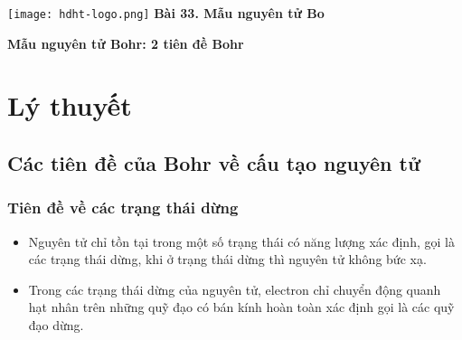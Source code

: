 \newcommand{\chapter}[2][]{
	\newcommand{\chapname}{#2}
	\begin{flushleft}
		\begin{minipage}[t]{\linewidth}
			\texttt{[image: hdht-logo.png]}
			\hspace{0pt}	
			\sffamily\bfseries\large Bài  33. Mẫu nguyên tử Bo
			\begin{flushleft}
				\huge\bfseries #1
			\end{flushleft}
		\end{minipage}
	\end{flushleft}
	\vspace{1cm}
	\normalfont\normalsize
}
\chapter[Mẫu nguyên tử Bohr: 2 tiên đề Bohr]{Mẫu nguyên tử Bohr: 2 tiên đề Bohr}

\section{Lý thuyết}

\subsection{Các tiên đề của Bohr về cấu tạo nguyên tử}
\subsubsection{Tiên đề về các trạng thái dừng}
	\begin{itemize}
		\item Nguyên tử chỉ tồn tại trong một số trạng thái có năng lượng xác định, gọi là các trạng thái dừng, khi ở trạng thái dừng thì nguyên tử không bức xạ.
		\item Trong các trạng thái dừng của nguyên tử, electron chỉ chuyển động quanh hạt nhân trên những quỹ đạo có bán kính hoàn toàn xác định gọi là các quỹ đạo dừng.
	\end{itemize}

